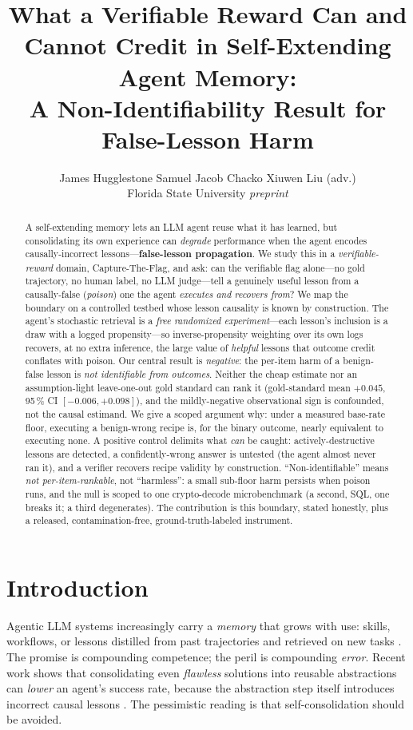 \documentclass[10pt,twocolumn]{article}
\title{\vspace{-2.5em}\bfseries What a Verifiable Reward Can and Cannot Credit in
Self-Extending Agent Memory:\\ A Non-Identifiability Result for False-Lesson Harm}
\author{James Hugglestone \quad Samuel Jacob Chacko \quad Xiuwen Liu (adv.)\\
\small Florida State University \quad\textemdash\quad \emph{preprint}}
\date{}
\begin{document}
\maketitle

\begin{abstract}
\noindent
A self-extending memory lets an LLM agent reuse what it has learned, but consolidating
its own experience can \emph{degrade} performance when the agent encodes
causally-incorrect lessons---\textbf{false-lesson propagation}. We study this in a
\emph{verifiable-reward} domain, Capture-The-Flag, and ask: can the verifiable flag
alone---no gold trajectory, no human label, no LLM judge---tell a genuinely useful lesson
from a causally-false (\emph{poison}) one the agent \emph{executes and recovers from}? We
map the boundary on a controlled testbed whose lesson causality is known by
construction. The agent's stochastic retrieval is a \emph{free randomized experiment}---each
lesson's inclusion is a draw with a logged propensity---so inverse-propensity weighting
over its own logs recovers, at no extra inference, the large value of \emph{helpful}
lessons that outcome credit conflates with poison. Our
central result is \emph{negative}: the per-item harm of a benign-false lesson is \emph{not
identifiable from outcomes}. Neither the cheap estimate nor an assumption-light
leave-one-out gold standard can rank it (gold-standard mean $+0.045$, 95\,\% CI
$[-0.006,+0.098]$), and
the mildly-negative observational sign is confounded, not the causal estimand. We give a
scoped argument why: under a measured base-rate floor, executing a benign-wrong recipe is,
for the binary outcome, nearly equivalent to executing none. A positive control delimits
what \emph{can} be caught: actively-destructive lessons are detected, a confidently-wrong
answer is untested (the agent almost never ran it), and a verifier recovers recipe
validity by construction. ``Non-identifiable'' means \emph{not
per-item-rankable}, not ``harmless'': a small sub-floor harm persists when poison
runs, and the null is scoped to one crypto-decode microbenchmark (a second, SQL, one
breaks it; a third degenerates). The contribution is this boundary, stated honestly, plus
a released, contamination-free, ground-truth-labeled instrument.
\end{abstract}

\section{Introduction}
Agentic LLM systems increasingly carry a \emph{memory} that grows with use: skills,
workflows, or lessons distilled from past trajectories and retrieved on new tasks
\citep{Voyager,ExpeL,AWM,AMEM,GenerativeAgents}. The promise is compounding
competence; the peril is compounding \emph{error}. Recent work shows that
consolidating even \emph{flawless} solutions into reusable abstractions can
\emph{lower} an agent's success rate, because the abstraction step itself
introduces incorrect causal lessons \citep{FaultyMemory,ExperienceFollowing}.
The pessimistic reading is that self-consolidation should be avoided.
\end{document}
